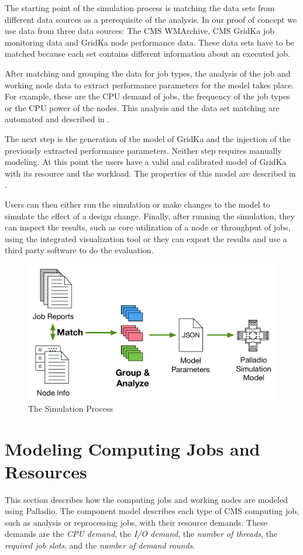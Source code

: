 \documentclass{webofc}
\begin{document}
The starting point of the simulation process is matching the data sets from different data sources as a prerequisite  of the analysis. In our proof of concept we use data from three data sources: The CMS WMArchive, CMS GridKa job monitoring data and GridKa node performance data. These data sets have to be matched because each set contains different information about an executed job.

After matching and grouping the data for job types, the analysis of the job and working node data to extract performance parameters for the model takes place. For example, these are the CPU demand of jobs, the frequency of the job types or the CPU power of the nodes. This analysis and the data set matching are automated and described in .

The next step is the generation of the model of GridKa and the injection of the previously extracted performance parameters. Neither step requires manually modeling. At this point the users have a valid and calibrated model of GridKa with its resource and the workload. The properties of this model are described in .

Users can then either run the simulation or make changes to the model to simulate the effect of a design change. 
Finally, after running the simulation, they can inspect the results, such as core utilization of a node or throughput of jobs, using the integrated visualization tool or they can export the results and use a third party software to do the evaluation.

\begin{figure}
	\centering
	\includegraphics[width=0.39\linewidth]{images/process}
	\caption[]{The Simulation Process}
	\label{process}
\end{figure}


\section{Modeling Computing Jobs and Resources}
\label{sec:model}
This section describes how the computing jobs and working nodes are modeled using Palladio.
The component model describes each type of CMS computing job, such as analysis or reprocessing jobs, with their resource demands. These demands are the \textit{CPU demand}, the\textit{ I/O demand}, the \textit{number of threads}, the \textit{required job slots}, and the \textit{number of demand rounds}.
\end{document}
